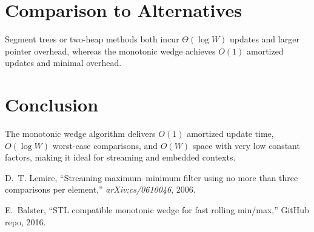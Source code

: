 \documentclass[12pt,letterpaper]{article}
\begin{document}
\section{Comparison to Alternatives}
Segment trees or two-heap methods both incur \(\Theta(\log W)\) updates and larger pointer overhead, whereas the monotonic wedge achieves \(O(1)\) amortized updates and minimal overhead.

\section{Conclusion}
The monotonic wedge algorithm delivers \(O(1)\) amortized update time, \(O(\log W)\) worst-case comparisons, and \(O(W)\) space with very low constant factors, making it ideal for streaming and embedded contexts.

\begin{thebibliography}{9}
D.~T. Lemire, “Streaming maximum–minimum filter using no more than three comparisons per element,” \emph{arXiv:cs/0610046}, 2006.

E.~Balster, “STL compatible monotonic wedge for fast rolling min/max,” GitHub repo, 2016.
\end{thebibliography}
\end{document}
